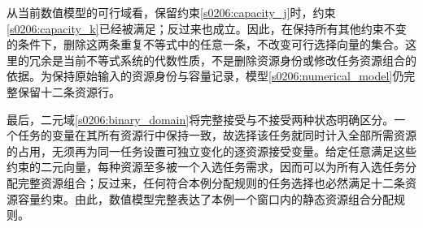 从当前数值模型的可行域看，保留约束\eqref{s0206:capacity_j}时，约束\eqref{s0206:capacity_k}已经被满足；反过来也成立。因此，在保持所有其他约束不变的条件下，删除这两条重复不等式中的任意一条，不改变可行选择向量的集合。这里的冗余是当前不等式系统的代数性质，不是删除资源身份或修改任务资源组合的依据。为保持原始输入的资源身份与容量记录，模型\eqref{s0206:numerical_model}仍完整保留十二条资源行。

最后，二元域\eqref{s0206:binary_domain}将完整接受与不接受两种状态明确区分。一个任务的变量在其所有资源行中保持一致，故选择该任务就同时计入全部所需资源的占用，无须再为同一任务设置可独立变化的逐资源接受变量。给定任意满足这些约束的二元向量，每种资源至多被一个入选任务需求，因而可以为所有入选任务分配完整资源组合；反过来，任何符合本例分配规则的任务选择也必然满足十二条资源容量约束。由此，数值模型完整表达了本例一个窗口内的静态资源组合分配规则。
